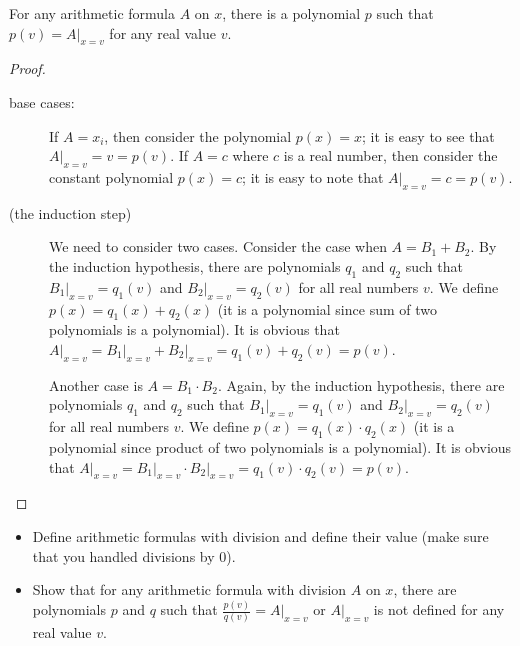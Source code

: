 \begin{theorem}
\label{theorem:formulas-to-polynomials}
  For any arithmetic formula $A$ on $x$, there is a polynomial
  $p$ such that $p(v) = A\big\rvert_{x = v}$ for any real value $v$.
\end{theorem}
\begin{proof}
  \begin{description}
    \item[base cases:] If $A = x_i$, then consider the polynomial $p(x) = x$;
      it is easy to see that $A\big\rvert_{x = v} = v = p(v)$.
      If $A = c$ where $c$ is a real number, then consider the constant
      polynomial  $p(x) = c$; it is easy to note that $A\big\rvert_{x = v} = c =
       p(v)$.
    \item [(the induction step)] We need to consider two cases. Consider the case when
      $A = B_1 + B_2$. By the induction hypothesis, there are polynomials $q_1$
      and $q_2$ such that $B_1\big\rvert_{x = v} = q_1(v)$ and
      $B_2\big\rvert_{x = v} = q_2(v)$ for all real numbers $v$.
      We define $p(x) = q_1(x) + q_2(x)$ (it is a polynomial since sum of
      two polynomials is a polynomial). It is obvious that
      $A\big\rvert_{x = v} = B_1\big\rvert_{x = v} + B_2\big\rvert_{x = v} =
      q_1(v) + q_2(v) = p(v)$.

      Another case is $A = B_1 \cdot B_2$. Again, by the induction hypothesis,
      there are polynomials $q_1$ and $q_2$ such that
      $B_1\big\rvert_{x = v} = q_1(v)$ and
      $B_2\big\rvert_{x = v} = q_2(v)$ for all real numbers $v$.
      We define $p(x) = q_1(x) \cdot q_2(x)$ (it is a polynomial since product of
      two polynomials is a polynomial). It is obvious that
      $A\big\rvert_{x = v} = B_1\big\rvert_{x = v} \cdot B_2\big\rvert_{x = v} =
      q_1(v) \cdot q_2(v) = p(v)$.
  \end{description}
\end{proof}

\begin{exercise}
  \begin{itemize}
    \item Define arithmetic formulas with division and define their value (make
      sure that you handled divisions by $0$).

    \item Show that for any arithmetic formula with division $A$ on $x$,
      there are polynomials $p$ and $q$ such that $\frac{p(v)}{q(v)} =
      A\big\rvert_{x = v}$ or $A\big\rvert_{x = v}$ is not defined for
      any real value $v$.
  \end{itemize}
\end{exercise}


